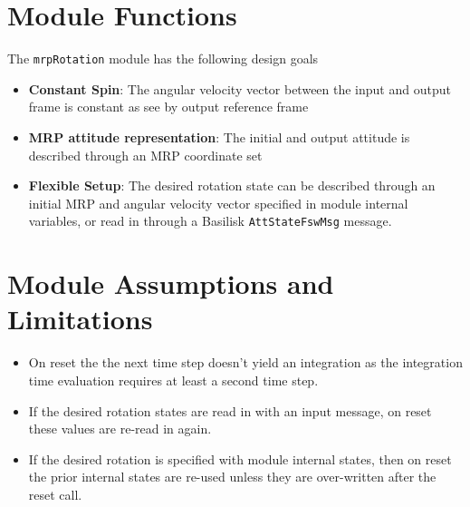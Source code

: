 

\section{Module Functions}
The {\tt mrpRotation} module has the following design goals
\begin{itemize}
	\item \textbf{Constant Spin}: The angular velocity vector between the input and output frame is constant as see by output reference frame
	\item \textbf{MRP attitude representation}: The initial and output attitude is described through an MRP coordinate set
	\item \textbf{Flexible Setup}:  The desired rotation state can be described through an initial MRP and angular velocity vector specified in module internal variables, or read in through a Basilisk {\tt AttStateFswMsg} message.
\end{itemize}

\section{Module Assumptions and Limitations}
\begin{itemize}
	\item On reset the the next time step doesn't yield an integration as the integration time evaluation requires at least a second time step.
	\item If the desired rotation states are read in with an input message, on reset these values are re-read in again.
	\item If the desired rotation is specified with module internal states, then on reset the prior internal states are re-used unless they are over-written after the reset call.
\end{itemize}
